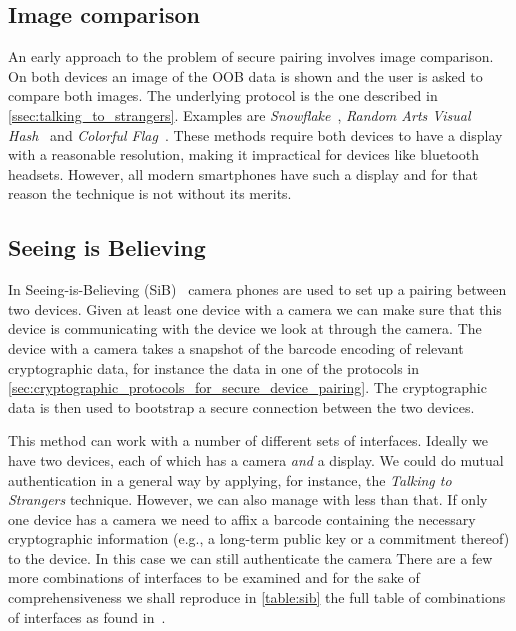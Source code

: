 \documentclass[conference, 11pt]{sty/IEEEtran}
\begin{document}
\subsection{Image comparison}
An early approach to the problem of secure pairing involves image comparison.
On both devices an image of the OOB data is shown and the user is asked to compare both images.
The underlying protocol is the one described in \autoref{ssec:talking_to_strangers}.
Examples are \textit{Snowflake}~\cite{goldberg1996visual}, \textit{Random Arts Visual Hash}~\cite{perrig1999hash} and \textit{Colorful Flag}~\cite{dohrmann2002public}.
These methods require both devices to have a display with a reasonable resolution, making it impractical for devices like bluetooth headsets.
However, all modern smartphones have such a display and for that reason the technique is not without its merits.

\subsection{Seeing is Believing}
In Seeing-is-Believing (SiB)~\cite{mccune2005seeing} camera phones are used to set up a pairing between two devices.
Given at least one device with a camera we can make sure that this device is communicating with the device we look at through the camera.
The device with a camera takes a snapshot of the barcode encoding of relevant cryptographic data, for instance the data in one of the protocols in \autoref{sec:cryptographic_protocols_for_secure_device_pairing}.
The cryptographic data is then used to bootstrap a secure connection between the two devices.

This method can work with a number of different sets of interfaces.
Ideally we have two devices, each of which has a camera \emph{and} a display.
We could do mutual authentication in a general way by applying, for instance, the \emph{Talking to Strangers} technique.
However, we can also manage with less than that.
If only one device has a camera we need to affix a barcode containing the necessary cryptographic information (e.g., a long-term public key or a commitment thereof) to the device.
In this case we can still authenticate the camera 
There are a few more combinations of interfaces to be examined and for the sake of comprehensiveness we shall reproduce in \autoref{table:sib} the full table of combinations of interfaces as found in~\cite{mccune2005seeing}.
\end{document}
